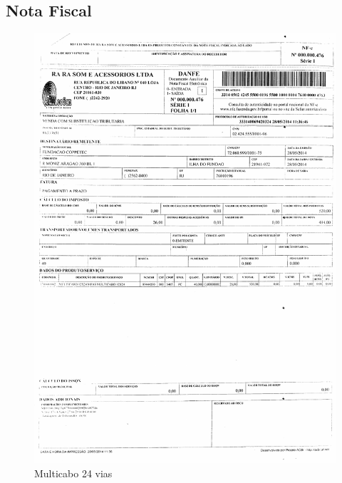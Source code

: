 \subsection{Nota Fiscal}
\begin{figure}[H]
 \centering
 \includegraphics[width=0.9\columnwidth]{Multicabos/nota_multicabos.pdf}
 \caption{Multicabo 24 vias}
 \end{figure}